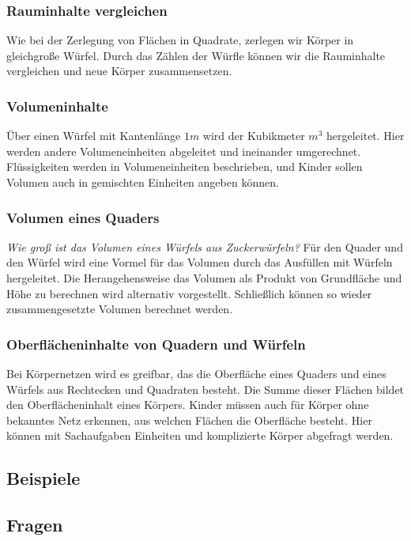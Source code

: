 \documentclass{article}
\begin{document}
\subsubsection*{ Rauminhalte vergleichen}
Wie bei der Zerlegung von Flächen in Quadrate, zerlegen wir Körper in gleichgroße Würfel. Durch das Zählen der Würfle können wir die Rauminhalte vergleichen und neue Körper zusammensetzen. 
\subsubsection*{ Volumeninhalte}
Über einen Würfel mit Kantenlänge $1m$ wird der Kubikmeter $m^3$ hergeleitet. Hier werden andere Volumeneinheiten abgeleitet und ineinander umgerechnet. Flüssigkeiten werden in Volumeneinheiten beschrieben, und Kinder sollen Volumen auch in gemischten Einheiten angeben können.
\subsubsection*{ Volumen eines Quaders}
\textit{Wie groß ist das Volumen eines Würfels aus Zuckerwürfeln?}
Für den Quader und den Würfel wird eine Vormel für das Volumen durch das Ausfüllen mit Würfeln hergeleitet. Die Herangehensweise das Volumen als Produkt von Grundfläche und Höhe zu berechnen wird alternativ vorgestellt.
Schließlich können so wieder zusammengesetzte Volumen berechnet werden.
\subsubsection*{Oberflächeninhalte von Quadern und Würfeln}
Bei Körpernetzen wird es greifbar, das die Oberfläche eines Quaders und eines Würfels aus Rechtecken und Quadraten besteht. Die Summe dieser Flächen bildet den Oberflächeninhalt eines Körpers.
Kinder müssen auch für Körper ohne bekanntes Netz erkennen, aus welchen Flächen die Oberfläche besteht. Hier können mit Sachaufgaben Einheiten und komplizierte Körper abgefragt werden.
\subsection{Beispiele}
\subsection{Fragen}
\end{document}
